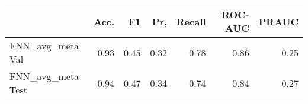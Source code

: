 \begin{tabular}{lrrrrrr}
\toprule
{} &  Acc. &    F1 &   Pr, &  Recall &  ROC-AUC &  PRAUC \\
\midrule
FNN\_avg\_meta Val  &  0.93 &  0.45 &  0.32 &    0.78 &     0.86 &   0.25 \\
FNN\_avg\_meta Test &  0.94 &  0.47 &  0.34 &    0.74 &     0.84 &   0.27 \\
\bottomrule
\end{tabular}
